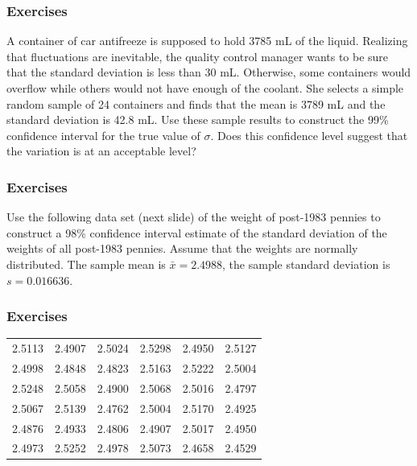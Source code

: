 \documentclass[xcolor=dvipsnames]{beamer}
\begin{document}
\begin{frame}
  \frametitle{Exercises}
  {\ubung} A container of car antifreeze is supposed to hold 3785 mL
  of the liquid. Realizing that fluctuations are inevitable, the
  quality control manager wants to be sure that the standard deviation
  is less than 30 mL. Otherwise, some containers would overflow while
  others would not have enough of the coolant. She selects a simple
  random sample of 24 containers and finds that the mean is 3789 mL
  and the standard deviation is 42.8 mL. Use these sample results to
  construct the 99\% confidence interval for the true value of
  $\sigma$. Does this confidence level suggest that the variation is
  at an acceptable level?
\end{frame}

\begin{frame}
  \frametitle{Exercises}
  {\ubung} Use the following data set (next slide) of the weight of
  post-1983 pennies to construct a 98\% confidence interval estimate
  of the standard deviation of the weights of all post-1983 pennies.
  Assume that the weights are normally distributed. The sample mean is
  $\bar{x}=2.4988$, the sample standard deviation is $s=0.016636$.
\end{frame}

\begin{frame}
  \frametitle{Exercises}
  \begin{tabular}{|rrrrrr|}\hline
2.5113 & 2.4907 & 2.5024 & 2.5298 & 2.4950 & 2.5127 \\
2.4998 & 2.4848 & 2.4823 & 2.5163 & 2.5222 & 2.5004 \\
2.5248 & 2.5058 & 2.4900 & 2.5068 & 2.5016 & 2.4797 \\
2.5067 & 2.5139 & 2.4762 & 2.5004 & 2.5170 & 2.4925 \\
2.4876 & 2.4933 & 2.4806 & 2.4907 & 2.5017 & 2.4950 \\
2.4973 & 2.5252 & 2.4978 & 2.5073 & 2.4658 & 2.4529 \\ \hline
  \end{tabular}
\end{frame}
\end{document}
